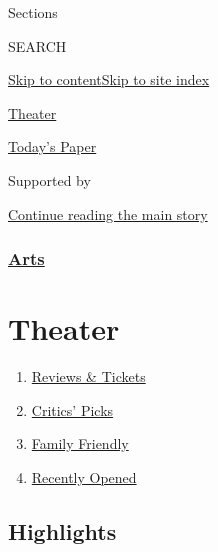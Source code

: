 Sections

SEARCH

\protect\hyperlink{site-content}{Skip to
content}\protect\hyperlink{site-index}{Skip to site index}

\href{https://www.nytimes.com/section/theater}{Theater}

\href{https://myaccount.nytimes.com/auth/login?response_type=cookie\&client_id=vi}{}

\href{https://www.nytimes.com/section/todayspaper}{Today's Paper}

Supported by

\protect\hyperlink{after-sponsor}{Continue reading the main story}

\hypertarget{arts}{%
\subsubsection{\texorpdfstring{\href{arts}{Arts}}{Arts}}\label{arts}}

\hypertarget{theater}{%
\section{Theater}\label{theater}}

\begin{enumerate}
\def\labelenumi{\arabic{enumi}.}
\tightlist
\item
  \href{/reviews/theater}{Reviews \& Tickets}
\item
  \href{/reviews/theater/critics-pick}{Critics' Picks}
\item
  \href{/reviews/theater/family-friendly}{Family Friendly}
\item
  \href{/reviews/theater/recently-opened}{Recently Opened}
\end{enumerate}

\hypertarget{highlights}{%
\subsection{Highlights}\label{highlights}}

